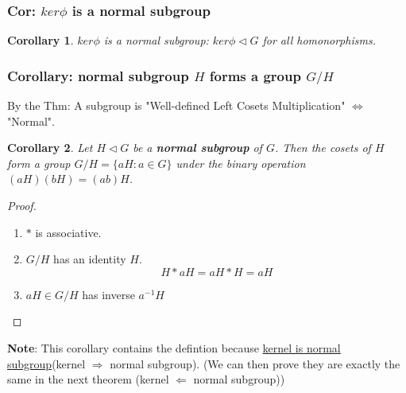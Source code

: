 \documentclass[11pt,a4paper]{article}
\newtheorem{corollary}{Corollary}
\begin{document}
\subsubsection{Cor: $ker\phi$ is a normal subgroup}
\begin{corollary}
    $ker\phi$ is a normal subgroup: $ker\phi \lhd G$ for all homonorphisms.
\end{corollary}


\subsubsection{Corollary: normal subgroup $H$ forms a group $G/H$}
By the Thm: A subgroup is "Well-defined Left Cosets Multiplication" $\Leftrightarrow$ "Normal".
\begin{corollary}
    Let $H\lhd  G$ be a \textbf{normal subgroup} of $G$. Then the cosets of $H$ form a group $G/H=\{aH:a\in G\}$ under the
    binary operation $(aH)(bH) = (ab)H$.
\end{corollary}
\begin{proof}
\quad

\begin{enumerate}[$(1)$]
    \item $*$ is associative.
    \item $G/H$ has an identity $H$. $$H*aH=aH*H=aH$$
    \item $aH\in G/H$ has inverse $a^{-1}H$
\end{enumerate}
\end{proof}
\textbf{Note}: This corollary contains the defintion because \underline{kernel is normal subgroup}(kernel $\Rightarrow$ normal subgroup). (We can then prove they are exactly the same in the next theorem (kernel $\Leftarrow$ normal subgroup))
\end{document}

